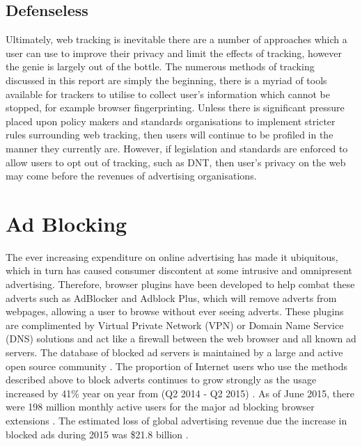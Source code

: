 \documentclass{article}
\begin{document}
\subsection{Defenseless}
Ultimately, web tracking is inevitable there are a number of approaches which a user can use to improve their privacy and limit the effects of tracking, however the genie is largely out of the bottle. The numerous methods of tracking discussed in this report are simply the beginning, there is a myriad of tools available for trackers to utilise to collect user's information which cannot be stopped, for example browser fingerprinting. Unless there is significant pressure placed upon policy makers and standards organisations to implement stricter rules surrounding web tracking, then users will continue to be profiled in the manner they currently are. However, if legislation and standards are enforced to allow users to opt out of tracking, such as DNT, then user's privacy on the web may come before the revenues of advertising organisations.    

\section{Ad Blocking}
The ever increasing expenditure on online advertising has made it ubiquitous, which in turn has caused consumer discontent at some intrusive and omnipresent advertising. Therefore, browser plugins have been developed to help combat these adverts such as AdBlocker and Adblock Plus, which will remove adverts from webpages, allowing a user to browse without ever seeing adverts. These plugins are complimented by Virtual Private Network (VPN) or Domain Name Service (DNS) solutions and act like a firewall between the web browser and all known ad servers. The database of blocked ad servers is maintained by a large and active open source community \parencite{adobeAdBlock}. The proportion of Internet users who use the methods described above to block adverts continues to grow strongly as the usage increased by 41\% year on year from (Q2 2014 - Q2 2015) \parencite{adobeAdBlock}. As of June 2015, there were 198 million monthly active users for the major ad blocking browser extensions \parencite{adobeAdBlock}. The estimated loss of global advertising revenue due the increase in blocked ads during 2015 was \$21.8 billion \parencite{adobeAdBlock}. 
\end{document}
